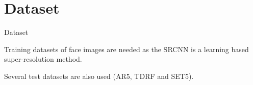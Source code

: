 \section{Dataset}
\begin{frame}{Dataset}{}


    \begin{block}{}

        Training datasets of face images are needed as the SRCNN is a learning based super-resolution method.

        \begin{table}[]
        \end{table}

        Several test datasets are also used (AR5, TDRF and SET5).
    \end{block}
\end{frame}


